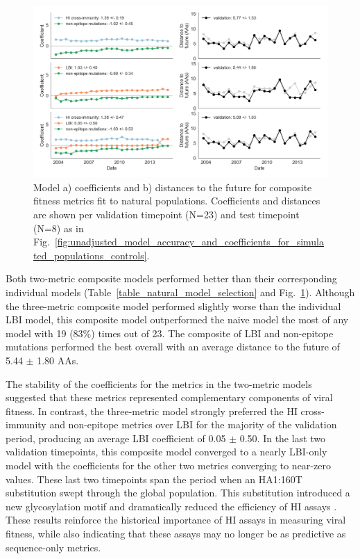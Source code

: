 \begin{figure}[ht]
  \begin{center}
  \includegraphics[width=\textwidth]{figures/best-composite-unadjusted-model-accuracy-and-coefficients-for-natural-populations.png}
  \caption{
    Model a) coefficients and b) distances to the future for composite fitness metrics fit to natural populations.
    Coefficients and distances are shown per validation timepoint (N=23) and test timepoint (N=8) as in Fig.~\ref{fig:unadjusted_model_accuracy_and_coefficients_for_simulated_populations_controls}.
  }
  \label{fig:unadjusted_composite_model_accuracy_and_coefficients_for_natural_populations}
  \end{center}
\end{figure}

Both two-metric composite models performed better than their corresponding individual models (Table~\ref{table_natural_model_selection} and Fig.~\ref{fig:unadjusted_composite_model_accuracy_and_coefficients_for_natural_populations}).
Although the three-metric composite model performed slightly worse than the individual LBI model, this composite model outperformed the naive model the most of any model with 19 (83\%) times out of 23.
The composite of LBI and non-epitope mutations performed the best overall with an average distance to the future of 5.44 $\pm$ 1.80 AAs.

The stability of the coefficients for the metrics in the two-metric models suggested that these metrics represented complementary components of viral fitness.
In contrast, the three-metric model strongly preferred the HI cross-immunity and non-epitope metrics over LBI for the majority of the validation period, producing an average LBI coefficient of 0.05 $\pm$ 0.50.
In the last two validation timepoints, this composite model converged to a nearly LBI-only model with the coefficients for the other two metrics converging to near-zero values.
These last two timepoints span the period when an HA1:160T substitution swept through the global population.
This substitution introduced a new glycosylation motif and dramatically reduced the efficiency of HI assays \cite{Zost2017}.
These results reinforce the historical importance of HI assays in measuring viral fitness, while also indicating that these assays may no longer be as predictive as sequence-only metrics.

